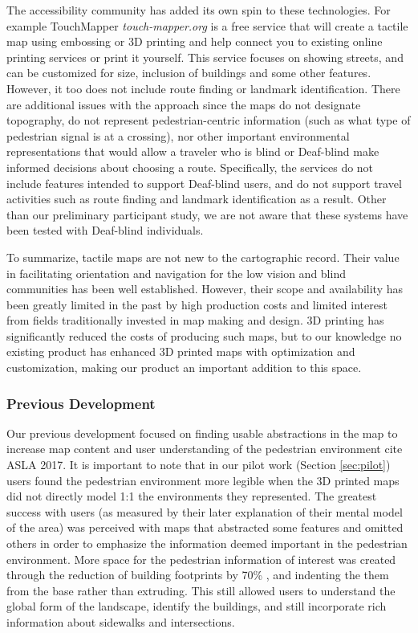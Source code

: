 The accessibility community has added its own spin to these technologies. For example TouchMapper \textit{touch-mapper.org} is a free service that will create a tactile map using embossing or 3D printing and help connect you to existing online printing services or print it yourself.  This service focuses on showing streets, and can be customized for size, inclusion of buildings and some other features. However, it too does not include route finding or landmark identification. There are additional issues with the approach since the maps do not designate topography, do not represent pedestrian-centric information (such as what type of pedestrian signal is at a crossing), nor other important environmental representations that would allow a traveler who is blind or Deaf-blind make informed decisions about choosing a route. 
Specifically, the services do not include features intended to support Deaf-blind users, and do not support travel activities such as route finding and landmark identification as a result. Other than our preliminary participant study, we are not aware that these systems have been tested with Deaf-blind individuals.


To summarize, tactile maps are not new to the cartographic record. Their value in facilitating orientation and navigation for the low vision and blind communities has been well established. However, their scope and availability has been greatly limited in the past by high production costs and limited interest from fields traditionally invested in map making and design.  3D printing has significantly reduced the costs of producing such maps, but to our knowledge no existing product has enhanced 3D printed maps with optimization and customization, making our product an important addition to this space. 


\subsubsection{Previous Development}

Our previous development focused on finding usable abstractions in the map to increase map content and user understanding of the pedestrian environment \ac{cite ASLA 2017}.
It is important to note that in our pilot work (Section \ref{sec:pilot}) users found the pedestrian environment more legible when the 3D printed maps did not directly model 1:1 the environments they represented. The greatest success with users (as measured by their later explanation of their mental model of the area) was perceived with maps that abstracted some features and omitted others in order to emphasize the information deemed important in the pedestrian environment. More space for the pedestrian information of interest was created through the reduction of building footprints by 70\% , and indenting the  them from the base rather than extruding. This still allowed users to understand the global form of the landscape, identify the buildings, and still incorporate rich information about sidewalks and intersections.


